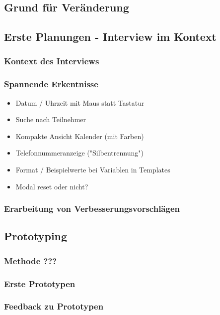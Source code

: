 \documentclass[12pt]{article}
\begin{document}
\subsection{Grund für Veränderung}

\subsection{Erste Planungen - Interview im Kontext}
\subsubsection{Kontext des Interviews}
\subsubsection{Spannende Erkentnisse}

\begin{itemize}
    \item Datum / Uhrzeit mit Maus statt Tastatur
    \item Suche nach Teilnehmer
    \item Kompakte Ansicht Kalender (mit Farben)
    \item Telefonnummeranzeige ("Silbentrennung")
    \item Format / Beispielwerte bei Variablen in Templates
    \item Modal reset oder nicht?
\end{itemize}

\subsubsection{Erarbeitung von Verbesserungsvorschlägen}

\subsection{Prototyping}
\subsubsection{Methode ???}
\subsubsection{Erste Prototypen}
\subsubsection{Feedback zu Prototypen}
\end{document}
